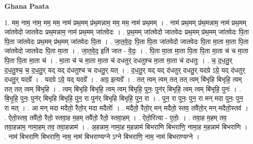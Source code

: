 \documentclass[17pt]{extarticle}
\begin{document}
\textbf{Ghana Paata } \newline

1. मम॒ नाम॒ नाम॒ मम॒ मम॒ नाम॑ प्रथ॒मम् प्र॑थ॒मन्नाम॒ मम॒ मम॒ नाम॑ प्रथ॒मम् । . नाम॑ प्रथ॒मम् प्र॑थ॒मन्नाम॒ नाम॑ प्रथ॒मम् जा॑तवेदो जातवेदः प्रथ॒मन्नाम॒ नाम॑ प्रथ॒मम् जा॑तवेदः । . प्र॒थ॒मम् जा॑तवेदो जातवेदः प्रथ॒मम् प्र॑थ॒मम् जा॑तवेदः पि॒ता पि॒ता जा॑तवेदः प्रथ॒मम् प्र॑थ॒मम् जा॑तवेदः पि॒ता । . जा॒त॒वे॒दः॒ पि॒ता पि॒ता जा॑तवेदो जातवेदः पि॒ता मा॒ता मा॒ता पि॒ता जा॑तवेदो जातवेदः पि॒ता मा॒ता । . जा॒त॒वे॒द॒ इति॑ जात - वे॒दः॒ । . पि॒ता मा॒ता मा॒ता पि॒ता पि॒ता मा॒ता च॑ च मा॒ता पि॒ता पि॒ता मा॒ता च॑ । . मा॒ता च॑ च मा॒ता मा॒ता च॑ दधतुर् दधतुश्च मा॒ता मा॒ता च॑ दधतुः । . च॒ द॒ध॒तु॒र् द॒ध॒तु॒श्च॒ च॒ द॒ध॒तु॒र् यद् यद् द॑धतुश्च च दधतु॒र् यत् । . द॒ध॒तु॒र् यद् यद् द॑धतुर् दधतु॒र् यदग्रे ऽग्रे॒ यद् द॑धतुर् दधतु॒र् यदग्रे᳚ । . यदग्रे ऽग्रे॒ यद् यदग्रे᳚ । . अग्र॒ इत्यग्रे᳚ । . तत् त्वम् त्वम् तत् तत् त्वम् बि॑भृहि बिभृहि॒ त्वम् तत् तत् त्वम् बि॑भृहि । . त्वम् बि॑भृहि बिभृहि॒ त्वम् त्वम् बि॑भृहि॒ पुनः॒ पुन॑र् बिभृहि॒ त्वम् त्वम् बि॑भृहि॒ पुनः॑ । . बि॒भृ॒हि॒ पुनः॒ पुन॑र् बिभृहि बिभृहि॒ पुन॒ रा पुन॑र् बिभृहि बिभृहि॒ पुन॒ रा । . पुन॒ रा पुनः॒ पुन॒ रा मन् मदा पुनः॒ पुन॒ रा मत् । . आ मन् मदा मदैतो॒ रैतो॒र् मदा मदैतोः᳚ । . मदैतो॒ रैतो॒र् मन् मदैतो॒ स्तव॒ तवै॑तो॒र् मन् मदैतो॒स्तव॑ । . ऐतो॒स्तव॒ तवै॑तो॒ रैतो॒ स्तवा॒ह म॒हम् तवै॑तो॒ रैतो॒ स्तवा॒हम् । . ऐतो॒रित्या - ए॒तोः॒ । . तवा॒ह म॒हम् तव॒ तवा॒हन्नाम॒ नामा॒हम् तव॒ तवा॒हन्नाम॑ । . अ॒हन्नाम॒ नामा॒ह म॒हन्नाम॑ बिभराणि बिभराणि॒ नामा॒ह म॒हन्नाम॑ बिभराणि । . नाम॑ बिभराणि बिभराणि॒ नाम॒ नाम॑ बिभराण्यग्ने ऽग्ने बिभराणि॒ नाम॒ नाम॑ बिभराण्यग्ने । \newline
\end{document}
